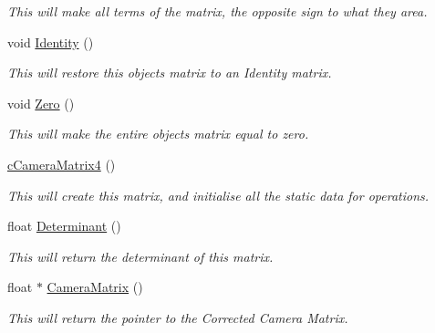 \begin{DoxyCompactItemize}
\begin{DoxyCompactList}\small\item\em This will make all terms of the matrix, the opposite sign to what they area. \end{DoxyCompactList}\item 
\hypertarget{classc_camera_matrix4_a23a05c1aff8a58dc662f5b871b422c17}{
void \hyperlink{classc_camera_matrix4_a23a05c1aff8a58dc662f5b871b422c17}{Identity} ()}
\label{classc_camera_matrix4_a23a05c1aff8a58dc662f5b871b422c17}

\begin{DoxyCompactList}\small\item\em This will restore this objects matrix to an Identity matrix. \end{DoxyCompactList}\item 
\hypertarget{classc_camera_matrix4_a1ec81a7ec3274f89d2b8fb94923345c0}{
void \hyperlink{classc_camera_matrix4_a1ec81a7ec3274f89d2b8fb94923345c0}{Zero} ()}
\label{classc_camera_matrix4_a1ec81a7ec3274f89d2b8fb94923345c0}

\begin{DoxyCompactList}\small\item\em This will make the entire objects matrix equal to zero. \end{DoxyCompactList}\item 
\hypertarget{classc_camera_matrix4_a99df6d312702e5474c5fedad42c95026}{
\hyperlink{classc_camera_matrix4_a99df6d312702e5474c5fedad42c95026}{cCameraMatrix4} ()}
\label{classc_camera_matrix4_a99df6d312702e5474c5fedad42c95026}

\begin{DoxyCompactList}\small\item\em This will create this matrix, and initialise all the static data for operations. \end{DoxyCompactList}\item 
\hypertarget{classc_camera_matrix4_a4f3456fc67fbd37692a8daa9d11d5fc6}{
float \hyperlink{classc_camera_matrix4_a4f3456fc67fbd37692a8daa9d11d5fc6}{Determinant} ()}
\label{classc_camera_matrix4_a4f3456fc67fbd37692a8daa9d11d5fc6}

\begin{DoxyCompactList}\small\item\em This will return the determinant of this matrix. \end{DoxyCompactList}\item 
\hypertarget{classc_camera_matrix4_a8dc77d23773120d4f3161b3ebceddda6}{
float $\ast$ \hyperlink{classc_camera_matrix4_a8dc77d23773120d4f3161b3ebceddda6}{CameraMatrix} ()}
\label{classc_camera_matrix4_a8dc77d23773120d4f3161b3ebceddda6}

\begin{DoxyCompactList}\small\item\em This will return the pointer to the Corrected Camera Matrix. \end{DoxyCompactList}\end{DoxyCompactItemize}
